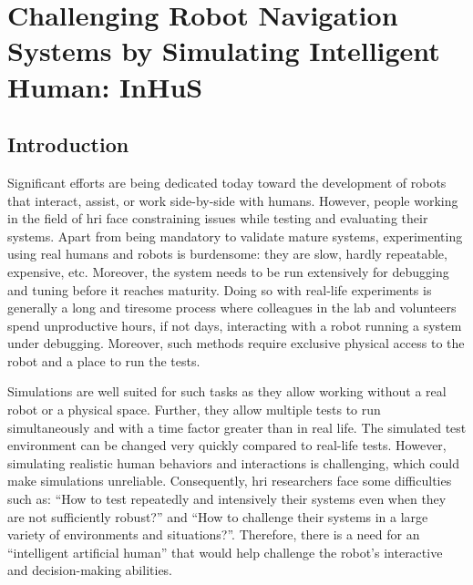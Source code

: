 \cleardoublepage

\ifdefined{}
\else
\setcounter{chapter}{6} %
\dominitoc
\faketableofcontents
\fi

\chapter{Challenging Robot Navigation Systems by Simulating Intelligent Human: InHuS}
\label{chap:7}
\minitoc


\section{Introduction}


Significant efforts are being dedicated today toward the development of robots that interact, assist, or work side-by-side with humans. However, people working in the field of \acrfull{hri} face constraining issues while testing and evaluating their systems. 
Apart from being mandatory to validate mature systems, experimenting using real humans and robots is burdensome: they are slow, hardly repeatable, expensive, etc. Moreover, the system needs to be run extensively for debugging and tuning before it reaches maturity. Doing so with real-life experiments is generally a long and tiresome process where colleagues in the lab and volunteers spend unproductive hours, if not days, interacting with a robot running a system under debugging. Moreover, such methods require exclusive physical access to the robot and a place to run the tests.

Simulations are well suited for such tasks as they allow working without a real robot or a physical space. Further, they allow multiple tests to run simultaneously and with a time factor greater than in real life. The simulated test environment can be changed very quickly compared to real-life tests. However, simulating realistic human behaviors and interactions is challenging, which could make simulations unreliable. Consequently, \acrshort{hri} researchers face some difficulties such as: ``How to test repeatedly and intensively their systems even when they are not sufficiently robust?'' and ``How to challenge their systems in a large variety of environments and situations?''. Therefore, there is a need for an ``intelligent artificial human'' that would help challenge the robot's interactive and decision-making abilities. 

